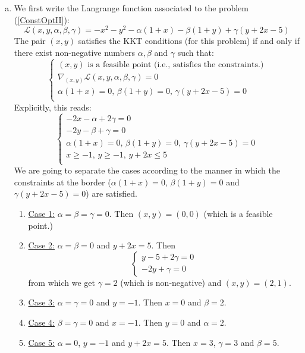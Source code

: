 \documentclass{ExerciseSheet}
\begin{document}
\begin{solution}
\begin{enumerate}[1.]
		\begin{enumerate}[a.] 
		\item We first write the Langrange function associated to the problem (\ref{ConstOptII}):
		\[\mathcal{L}(x,y,\alpha,\beta,\gamma)=
		-x^2-y^2
		-\alpha(1+x)
		-\beta(1+y)
		+\gamma(y+2x-5)
		\]
		The pair $(x,y)$ satisfies the KKT conditions (for this problem) if and only if there exist non-negative numbers $\alpha,\beta$ and $\gamma$ such that:
		\[
		\left\{
		\begin{array}{l}
		(x,y)\textrm { is a feasible point (i.e., satisfies the constraints.)}\\
		\nabla_{(x,y)}\mathcal{L}(x,y,\alpha,\beta,\gamma)=0\\
		\alpha(1+x)=0 ,\, \beta(1+y)=0 ,\, \gamma(y+2x-5)=0\\
		\end{array}
		\right.
		\]
		Explicitly, this reads:
		\[
		\left\{
		\begin{array}{l}
		-2x-\alpha+2\gamma=0\\
		-2y-\beta+\gamma=0\\
		\alpha(1+x)=0 ,\, \beta(1+y)=0 ,\, \gamma(y+2x-5)=0\\
		x\geq -1,\, y\geq -1, \, y+2x\leq 5\\
		\end{array}
		\right.
		\]
		We are going to separate the cases according to the manner in which the constraints at the border ($\alpha(1+x)=0$, $\beta(1+y)=0$ and $\gamma(y+2x-5)=0$) are satisfied.
		\begin{enumerate}
		\item \underline{Case 1:} $\alpha=\beta=\gamma=0$. Then $(x,y)=(0,0)$ (which is a feasible point.)
		\item \underline{Case 2:} $\alpha=\beta=0$ and $y+2x=5$. Then 
		\begin{equation}
			\begin{cases}
				y-5 +2\gamma= 0\\
				-2y+\gamma=0
			\end{cases}
		\end{equation}
		from which we get $\gamma=2$ (which is non-negative) and $(x,y)=(2,1)$.
		\item \underline{Case 3:} $\alpha=\gamma=0$ and $y=-1$. Then $x=0$ and $\beta=2$.
		\item \underline{Case 4:} $\beta=\gamma=0$ and $x=-1$. Then $y=0$ and $\alpha=2$.
		\item \underline{Case 5:} $\alpha=0$, $y=-1$ and $y+2x=5$. Then $x=3$, $\gamma=3$ and $\beta=5$.

\end{enumerate}
\end{enumerate}
\end{enumerate}
\end{solution}
\end{document}
